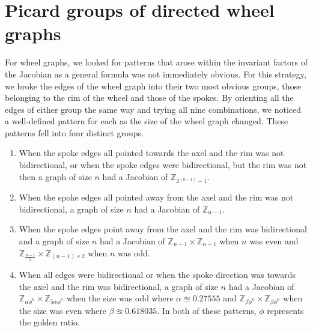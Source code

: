 \documentclass[11pt,reqno]{amsart}
\theoremstyle{definition}
\theoremstyle{plain}
\begin{document}


\section{Picard groups of directed wheel graphs} \label{section: wheel graphs}



For wheel graphs, we looked for patterns that arose within the invariant factors of the Jacobian as a
general formula was not immediately obvious.  For this strategy, we broke the edges of the wheel graph into their
two most obvious groups, those belonging to the rim of the wheel and those of the spokes.  By orienting all the
edges of either group the same way and trying all nine combinations, we noticed a well-defined pattern for each as
the size of the wheel graph changed.  These patterns fell into four distinct groups.

\begin{enumerate}
\item When the spoke edges all pointed towards the axel and the rim was not bidirectional, or when
the spoke edges were bidirectional, but the rim was not then a graph of size $n$ had a
Jacobian of $\mathbb{Z}_{2^{(n-1)}-1}$.
\item When the spoke edges all pointed away from the axel and the rim was not bidirectional,
a graph of size $n$ had a Jacobian of $\mathbb{Z}_{n-1}$.
\item When the spoke edges point away from the axel and the rim was bidirectional and a graph of size
$n$ had a Jacobian of $\mathbb{Z}_{n-1} \times \mathbb{Z}_{n-1}$ when $n$ was even
and $\mathbb{Z}_{\frac{n-1}{2}} \times \mathbb{Z}_{(n-1) \times 2}$ when $n$ was odd.
\item When all edges were bidirectional or when the spoke direction was towards the axel and
the rim was bidirectional, a graph of size $n$ had a Jacobian of
$\mathbb{Z}_{\alpha\phi^{n}} \times \mathbb{Z}_{5\alpha\phi^{n}}$ when the size
was odd where $\alpha \approxeq 0.27555$ and $\mathbb{Z}_{\beta\phi^{n}} \times \mathbb{Z}_{\beta\phi^{n}}$
when the size was even where $\beta \approxeq 0.618035$. In both of these patterns,
$\phi$ represents the golden ratio.
\end{enumerate}
\end{document}
